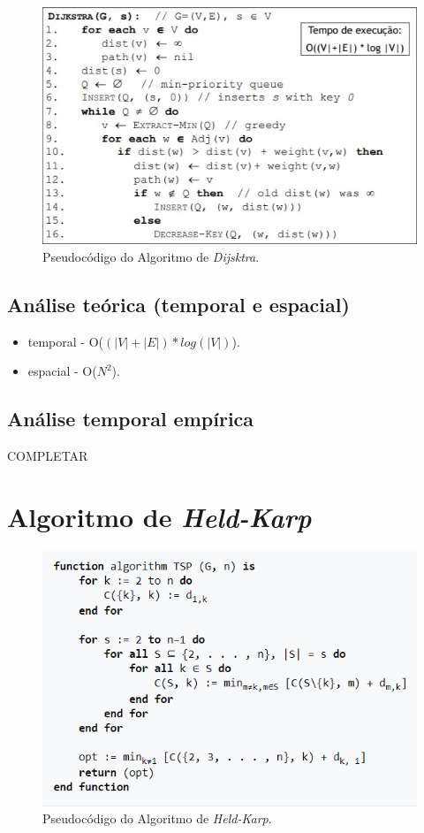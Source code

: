 \documentclass[article, a4paper, 12pt, oneside]{memoir}
\begin{document}
\begin{figure}[h!]
  \centerline{\includegraphics[scale=1]{Dijkstra_pseudocode.jpg}}
  \caption{Pseudocódigo do Algoritmo de \textit{Dijsktra}.}
\end{figure}

\subsection{Análise teórica (temporal e espacial)}

\begin{itemize}
	\item temporal -  O($(|V| + |E|)*log(|V|)$).
	\item espacial - O($N^2$).
\end{itemize}

\subsection{Análise temporal empírica }

{\Large COMPLETAR}

\section{Algoritmo de \textit{Held-Karp}}

\begin{figure}[h!]
  \centerline{\includegraphics[scale=1]{Held-Karp Algorithm.PNG}}
  \caption{Pseudocódigo do Algoritmo de \textit{Held-Karp}.}
\end{figure}
\end{document}
